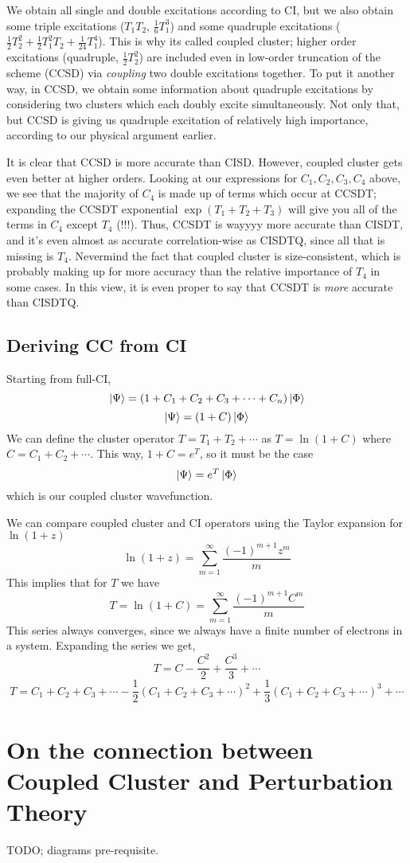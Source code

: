 \documentclass{article}
\newcommand{\lp}{\left(}
\newcommand{\rp}{\right)}
\begin{document}
We obtain all single and double excitations according to CI, but we also
obtain some triple excitations ($T_1 T_2$, $\frac{1}{6} T_1^3$) and some quadruple 
excitations ($\frac{1}{2} T_2^2 + \frac{1}{2} T_1^2 T_2 + \frac{1}{24} T_1^4 $).
This is why its called coupled cluster; higher order excitations 
(quadruple, $\frac{1}{2}T_2^2$) are included even in low-order truncation
of the scheme (CCSD) via \textit{coupling} two double excitations together.
To put it another way, in CCSD, we obtain some information about quadruple excitations 
by considering two clusters which each doubly excite simultaneously. 
Not only that, but CCSD is giving us quadruple excitation of relatively high importance,
according to our physical argument earlier. 

It is clear that CCSD is more accurate than CISD.
However, coupled cluster gets even better at higher orders. 
Looking at our expressions for $C_1, C_2, C_3, C_4$ above,
we see that the majority of $C_4$ is made up of terms which 
occur at CCSDT; expanding the CCSDT exponential 
$\exp(T_1 + T_2 + T_3)$ will give you all of the terms in $C_4$ except 
$T_4$ (!!!).
Thus, CCSDT is wayyyy more accurate than CISDT, and it's even 
almost as accurate correlation-wise as CISDTQ, since all that is missing is $T_4$.
Nevermind the fact  that coupled cluster is size-consistent, which is 
probably making up for more accuracy than the relative importance of $T_4$ in some cases.
In this view, it is even proper to say that CCSDT is \textit{more} accurate than CISDTQ.


\subsection{Deriving CC from CI}
Starting from full-CI,
\[ \ket{\Psi} = \lp 1 + C_1 + C_2 + C_3 + \cdots + C_n \rp \ket{\Phi} \]
\[ \ket{\Psi} = \lp 1 + C \rp \ket{\Phi} \]
We can define the cluster operator $T = T_1 + T_2 + \cdots$ as $T = \ln(1+C)$ where $C = C_1 + C_2 + \cdots$.
This way, $1 + C = e^T$, so it must be the case 
\[\ket{\Psi} = e^T \ket{\Phi} \]
which is our coupled cluster wavefunction.

We can compare coupled cluster and CI operators using the Taylor expansion for $\ln (1 + z)$
\[ \ln (1 + z) = \sum_{m=1}^{\infty} \frac{ (-1)^{m+1}  z^m}{ m} \]
This implies that for $T$ we have 
\[ T = \ln (1 + C) = \sum_{m=1}^{\infty} \frac{(-1)^{m+1}  C^m}{m} \]
This series always converges, since we always have a finite number of electrons in a system.
Expanding the series we get,
\[T = C - \frac{C^2}{2} + \frac{C^3}{3} + \cdots \]
\[T = C_1 + C_2 + C_3 + \cdots -  \frac{1}{2} ( C_1 + C_2 + C_3 + \cdots)^2 +  
  \frac{1}{3} (C_1 + C_2 + C_3 + \cdots)^3 +  \cdots
\]



\section{On the connection between Coupled Cluster and Perturbation Theory}
TODO; diagrams pre-requisite.
\end{document}
